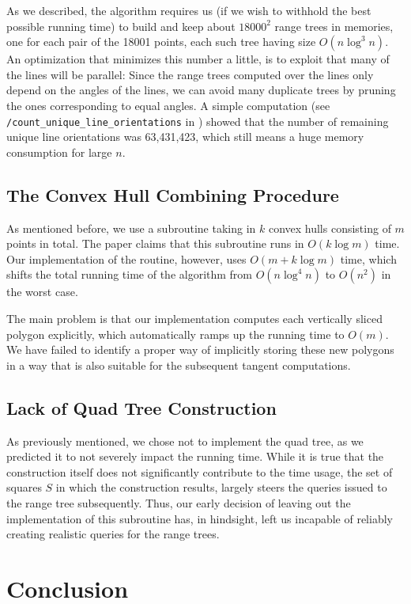 \documentclass{article}
\begin{document}
As we described, the algorithm requires us (if we wish to withhold the best possible running time) to build and keep about $18000^2$ range trees in memories, one for each pair of the 18001 points, each such tree having size $O(n \log^3 n)$. An optimization that minimizes this number a little, is to exploit that many of the lines will be parallel: Since the range trees computed over the lines only depend on the angles of the lines, we can avoid many duplicate trees by pruning the ones corresponding to equal angles. A simple computation (see \texttt{/count\_unique\_line\_orientations} in \cite{hm18}) showed that the number of remaining unique line orientations was 63,431,423, which still means a huge memory consumption for large $n$.

\subsection{The Convex Hull Combining Procedure}

As mentioned before, we use a subroutine taking in $k$ convex hulls consisting of $m$ points in total. The paper claims that this subroutine runs in $O(k \log m)$ time. Our implementation of the routine, however, uses $O(m + k\log m)$ time, which shifts the total running time of the algorithm from $O(n \log^4 n)$ to $O(n^2)$ in the worst case.

The main problem is that our implementation computes each vertically sliced polygon explicitly, which automatically ramps up the running time to $O(m)$. We have failed to identify a proper way of implicitly storing these new polygons in a way that is also suitable for the subsequent tangent computations. 

\subsection{Lack of Quad Tree Construction}

As previously mentioned, we chose not to implement the quad tree, as we predicted it to not severely impact the running time. While it is true that the construction itself does not significantly contribute to the time usage, the set of squares $S$ in which the construction results, largely steers the queries issued to the range tree subsequently. Thus, our early decision of leaving out the implementation of this subroutine has, in hindsight, left us incapable of reliably creating realistic queries for the range trees.

\section{Conclusion} \label{sec:conclusion}
\end{document}
